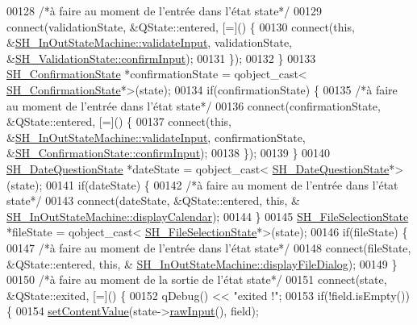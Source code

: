 \begin{DoxyCode}
00128         \textcolor{comment}{/*à faire au moment de l'entrée dans l'état state*/}
00129         connect(validationState, &QState::entered, [=]() \{
00130             connect(\textcolor{keyword}{this}, &\hyperlink{classSH__InOutStateMachine_a5a5804bd32a04d25926f6e323b906887}{SH\_InOutStateMachine::validateInput}, 
      validationState, &\hyperlink{classSH__ConfirmationState_ae47d89a7fc0ada8eb51d8bef2317b348}{SH\_ValidationState::confirmInput});
00131         \});
00132     \}
00133     \hyperlink{classSH__ConfirmationState}{SH\_ConfirmationState} *confirmationState = qobject\_cast<
      \hyperlink{classSH__ConfirmationState}{SH\_ConfirmationState}*>(state);
00134     \textcolor{keywordflow}{if}(confirmationState) \{
00135         \textcolor{comment}{/*à faire au moment de l'entrée dans l'état state*/}
00136         connect(confirmationState, &QState::entered, [=]() \{
00137             connect(\textcolor{keyword}{this}, &\hyperlink{classSH__InOutStateMachine_a5a5804bd32a04d25926f6e323b906887}{SH\_InOutStateMachine::validateInput}, 
      confirmationState, &\hyperlink{classSH__ConfirmationState_ae47d89a7fc0ada8eb51d8bef2317b348}{SH\_ConfirmationState::confirmInput});
00138         \});
00139     \}
00140     \hyperlink{classSH__DateQuestionState}{SH\_DateQuestionState} *dateState = qobject\_cast<
      \hyperlink{classSH__DateQuestionState}{SH\_DateQuestionState}*>(state);
00141     \textcolor{keywordflow}{if}(dateState) \{
00142         \textcolor{comment}{/*à faire au moment de l'entrée dans l'état state*/}
00143         connect(dateState, &QState::entered, \textcolor{keyword}{this}, &
      \hyperlink{classSH__InOutStateMachine_a0d241868828cbf9798233a8c74c69851}{SH\_InOutStateMachine::displayCalendar});
00144     \}
00145     \hyperlink{classSH__FileSelectionState}{SH\_FileSelectionState} *fileState = qobject\_cast<
      \hyperlink{classSH__FileSelectionState}{SH\_FileSelectionState}*>(state);
00146     \textcolor{keywordflow}{if}(fileState) \{
00147         \textcolor{comment}{/*à faire au moment de l'entrée dans l'état state*/}
00148         connect(fileState, &QState::entered, \textcolor{keyword}{this}, &
      \hyperlink{classSH__InOutStateMachine_aeddfbc098f5ee8ac05eadbaf37803fb1}{SH\_InOutStateMachine::displayFileDialog});
00149     \}
00150     \textcolor{comment}{/*à faire au moment de la sortie de l'état state*/}
00151     connect(state, &QState::exited, [=]() \{
00152         qDebug() << \textcolor{stringliteral}{"exited !"};
00153         \textcolor{keywordflow}{if}(!field.isEmpty()) \{
00154             \hyperlink{classSH__InOutStateMachine_aa2766b7a7ba39c35a10df7fc0c151b4f}{setContentValue}(state->\hyperlink{classSH__InOutState_a4b1ca094de91c47690ec2d1e95678273}{rawInput}(), field);

\end{DoxyCode}

